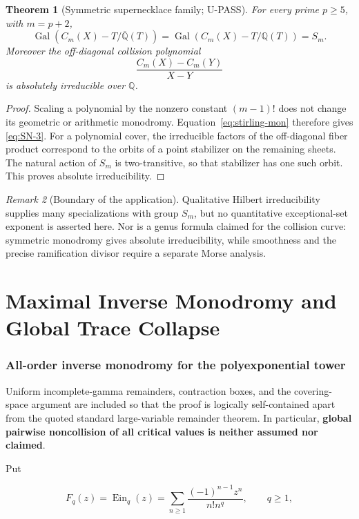 \documentclass[11pt]{article}
\theoremstyle{keio}
\newtheorem{theorem}{Theorem}[section]
\theoremstyle{definition}
\theoremstyle{remark}
\newtheorem{remark}[theorem]{Remark}
\newcommand{\Q}{\mathbb Q}
\newcommand{\Gal}{\operatorname{Gal}}
\newcommand{\UPASS}{\textcolor{keiogreen}{\textsf{U-PASS}}}
\begin{document}
\begin{theorem}[Symmetric supernecklace family; \UPASS]
For every prime \(p\ge5\), with \(m=p+2\),
\[
 \Gal(C_m(X)-T/\overline{\Q}(T))
 =\Gal(C_m(X)-T/\Q(T))=S_m.
 \tag{SN-3}\label{eq:SN-3}
\]
Moreover the off-diagonal collision polynomial
\[
 \boxed{\displaystyle
 \frac{C_m(X)-C_m(Y)}{X-Y}}
 \tag{SN-4}
\]
is absolutely irreducible over \(\Q\).
\end{theorem}

\begin{proof}
Scaling a polynomial by the nonzero constant \((m-1)!\) does not change its
geometric or arithmetic monodromy.  Equation~\eqref{eq:stirling-mon} therefore
gives \eqref{eq:SN-3}.  For a polynomial cover, the irreducible factors of the
off-diagonal fiber product correspond to the orbits of a point stabilizer on
the remaining sheets.  The natural action of \(S_m\) is two-transitive, so
that stabilizer has one such orbit.  This proves absolute irreducibility.
\end{proof}

\begin{remark}[Boundary of the application]
Qualitative Hilbert irreducibility supplies many specializations with group
\(S_m\), but no quantitative exceptional-set exponent is asserted here.
Nor is a genus formula claimed for the collision curve: symmetric
monodromy gives absolute irreducibility, while smoothness and the precise
ramification divisor require a separate Morse analysis.
\end{remark}

\part{Maximal Inverse Monodromy and Global Trace Collapse}
\section{All-order inverse monodromy for the polyexponential tower}

Uniform incomplete-gamma remainders, contraction boxes, and the covering-space
argument are included so that the proof is logically self-contained apart from
the quoted standard large-variable remainder theorem.  In particular,
\textbf{global pairwise noncollision of all critical values is neither assumed
nor claimed}.

Put

\[
 F_q(z)=\operatorname{Ein}_q(z)
 =\sum_{n\geq1}\frac{(-1)^{n-1}z^n}{n!n^q},\qquad q\geq1,
\]
\end{document}
